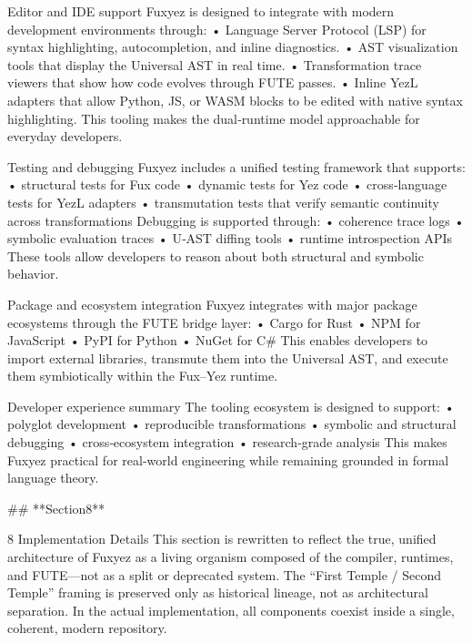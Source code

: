 Editor and IDE support
Fuxyez is designed to integrate with modern development environments through:
• 	Language Server Protocol (LSP) for syntax highlighting, autocompletion, and inline diagnostics.
• 	AST visualization tools that display the Universal AST in real time.
• 	Transformation trace viewers that show how code evolves through FUTE passes.
• 	Inline YezL adapters that allow Python, JS, or WASM blocks to be edited with native syntax highlighting.
This tooling makes the dual‑runtime model approachable for everyday developers.

Testing and debugging
Fuxyez includes a unified testing framework that supports:
• 	structural tests for Fux code
• 	dynamic tests for Yez code
• 	cross‑language tests for YezL adapters
• 	transmutation tests that verify semantic continuity across transformations
Debugging is supported through:
• 	coherence trace logs
• 	symbolic evaluation traces
• 	U‑AST diffing tools
• 	runtime introspection APIs
These tools allow developers to reason about both structural and symbolic behavior.

Package and ecosystem integration
Fuxyez integrates with major package ecosystems through the FUTE bridge layer:
• 	Cargo for Rust
• 	NPM for JavaScript
• 	PyPI for Python
• 	NuGet for C#
This enables developers to import external libraries, transmute them into the Universal AST, and execute them symbiotically within the Fux–Yez runtime.

Developer experience summary
The tooling ecosystem is designed to support:
• 	polyglot development
• 	reproducible transformations
• 	symbolic and structural debugging
• 	cross‑ecosystem integration
• 	research‑grade analysis
This makes Fuxyez practical for real-world engineering while remaining grounded in formal language theory.

## **Section8**

8 Implementation Details
This section is rewritten to reflect the true, unified architecture of Fuxyez as a living organism composed of the compiler, runtimes, and FUTE—not as a split or deprecated system. The “First Temple / Second Temple” framing is preserved only as historical lineage, not as architectural separation. In the actual implementation, all components coexist inside a single, coherent, modern repository.

